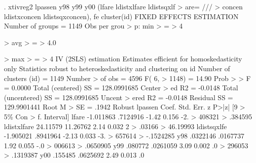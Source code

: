 . xtivreg2 lpassen y98 y99 y00 (lfare ldistxlfare ldistsqxlf
> are= ///
> concen ldistxconcen ldistsqxconcen), fe cluster(id)
{\smallskip}
FIXED EFFECTS ESTIMATION
Number of groups =      1149                    Obs per grou
> p: min                                                    
>        =                                                  
>                  4
                                                            
>    avg                                                    
>        =                                                  
>                4.0
                                                            
>    max                                                    
>        =                                                  
>                  4
{\smallskip}
IV (2SLS) estimation
{\smallskip}
Estimates efficient for homoskedasticity only
Statistics robust to heteroskedasticity and clustering on id
{\smallskip}
Number of clusters (id) =         1149                Number
>  of obs =     4596
                                                      F(  6,
>   1148) =    14.90
                                                      Prob >
>  F      =   0.0000
Total (centered) SS     =  128.0991685                Center
> ed R2   =  -0.0148
Total (uncentered) SS   =  128.0991685                Uncent
> ered R2 =  -0.0148
Residual SS             =  129.9901441                Root M
> SE      =    .1942
{\smallskip}
             {\VBAR}               Robust
     lpassen {\VBAR}      Coef.   Std. Err.      z    P>|z|     [9
> 5\% Con                                                    
>       f. Interval]
       lfare {\VBAR}  -1.011863   .7124916    -1.42   0.156    -2.
> 408321                                                    
>            .384595
 ldistxlfare {\VBAR}   24.11579   11.26762     2.14   0.032      2
> .03166                                                    
>           46.19993
ldistsqxlf{\tytilde}e {\VBAR}  -1.905021   .8941964    -2.13   0.033    -3.
> 657614                                                    
>          -.1524285
         y98 {\VBAR}   .0322146   .0167737     1.92   0.055    -.0
> 006613                                                    
>           .0650905
         y99 {\VBAR}    .080772   .0261059     3.09   0.002     .0
> 296053                                                    
>           .1319387
         y00 {\VBAR}    .155485   .0625692     2.49   0.013     .0
